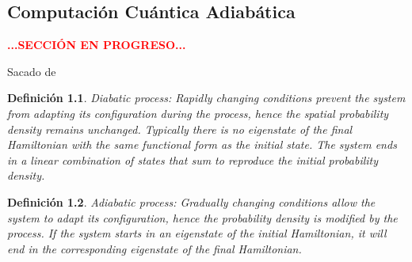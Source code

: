 \documentclass[11pt, spanish]{report}
\newcommand{\red}[1]{\textcolor{red}{#1}}
\numberwithin{equation}{section}
\newtheorem{defin}{Definición}[section]
\newtheorem{teo}[defin]{Teorema}
\numberwithin{defin}{section}
\begin{document}
\begin{appendices}
%
%
%

\chapter{Computación Cuántica Adiabática}
\begin{center}
\red{\textbf{...SECCIÓN EN PROGRESO...}}
\end{center}


Sacado de \cite{doi:10.1143/JPSJ.5.435}

\begin{defin}
Diabatic process: Rapidly changing conditions prevent the system from adapting its configuration during the process, hence the spatial probability density remains unchanged. Typically there is no eigenstate of the final Hamiltonian with the same functional form as the initial state. The system ends in a linear combination of states that sum to reproduce the initial probability density.
\end{defin}
\begin{defin}
Adiabatic process: Gradually changing conditions allow the system to adapt its configuration, hence the probability density is modified by the process. If the system starts in an eigenstate of the initial Hamiltonian, it will end in the corresponding eigenstate of the final Hamiltonian.
\end{defin}


\end{appendices}
\end{document}
